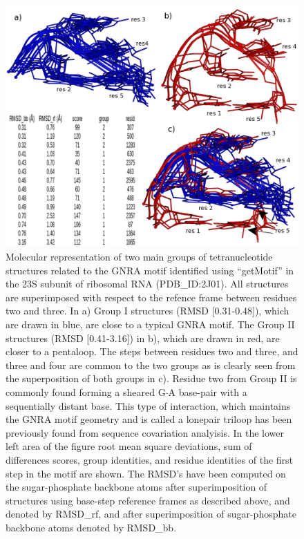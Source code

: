 \begin{figure}
\centering 
\includegraphics[angle=0, scale=2.2]{Chapter5/groupsB.png}
\caption{Molecular    representation   of    two   main    groups   of
  tetranucleotide  structures  related to  the  GNRA motif  identified
  using   ``getMotif''   in  the   23S   subunit   of  ribosomal   RNA
  (PDB\_ID:2J01).  All structures are superimposed with respect to the
  refence  frame  between residues  two  and  three.   In a)  Group  I
  structures (RMSD [0.31-0.48]), which are drawn in blue, are close to
  a typical GNRA motif.  The Group II structures (RMSD [0.41-3.16]) in
  b), which  are drawn in red,  are closer to a  pentaloop.  The steps
  between residues two and three, and three and four are common to the
  two groups as is clearly  seen from the superposition of both groups
  in  c).  Residue  two  from Group  II  is commonly  found forming  a
  sheared G$\cdot$A base-pair with  a sequentially distant base.  This
  type of interaction, which maintains  the GNRA motif geometry and is
  called a  lonepair triloop \cite{lee2003} has  been previously found
  from sequence covariation  analyisis. In the lower left  area of the
  figure root mean square deviations, sum of differences scores, group
  identities, and residue identities of the first step in the motif are
  shown.   The  RMSD's  have  been  computed  on  the  sugar-phosphate
  backbone atoms after  superimposition of structures using base-step
  reference  frames as described  above, and  denoted by  RMSD\_rf, and
  after superimposition of sugar-phosphate backbone  atoms denoted by
  RMSD\_bb.}
\label{fig:groupsB}
\end{figure}

